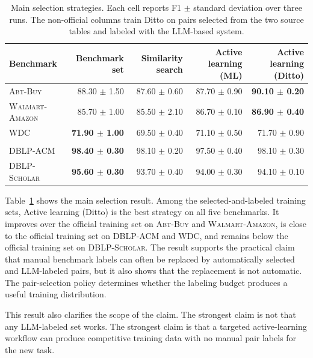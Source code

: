 \begin{table}[t]
  \centering
  \caption{Main selection strategies. Each cell reports F1 $\pm$ standard deviation over three runs. The non-official columns train Ditto on pairs selected from the two source tables and labeled with the LLM-based system.}
  \label{tab:selection-strategies}
  \small
  \begin{tabular}{lrrrr}
    \toprule
    Benchmark & Benchmark set & Similarity search & Active learning (ML) & Active learning (Ditto) \\
    \midrule
    \textsc{Abt-Buy} & 88.30 $\pm$ 1.50 & 87.60 $\pm$ 0.60 & 87.70 $\pm$ 0.90 & \textbf{90.10 $\pm$ 0.20} \\
    \textsc{Walmart-Amazon} & 85.70 $\pm$ 1.00 & 85.50 $\pm$ 2.10 & 86.70 $\pm$ 0.10 & \textbf{86.90 $\pm$ 0.40} \\
    \textsc{WDC} & \textbf{71.90 $\pm$ 1.00} & 69.50 $\pm$ 0.40 & 71.10 $\pm$ 0.50 & 71.70 $\pm$ 0.90 \\
    \\
    \textsc{DBLP-ACM} & \textbf{98.40 $\pm$ 0.30} & 98.10 $\pm$ 0.20 & 97.50 $\pm$ 0.40 & 98.10 $\pm$ 0.30 \\
    \textsc{DBLP-Scholar} & \textbf{95.60 $\pm$ 0.30} & 93.70 $\pm$ 0.40 & 94.00 $\pm$ 0.30 & 94.10 $\pm$ 0.10 \\
    \bottomrule
  \end{tabular}
\end{table}

Table~\ref{tab:selection-strategies} shows the main selection result. Among the selected-and-labeled training sets, Active learning (Ditto) is the best strategy on all five benchmarks. It improves over the official training set on \textsc{Abt-Buy} and \textsc{Walmart-Amazon}, is close to the official training set on \textsc{DBLP-ACM} and \textsc{WDC}, and remains below the official training set on \textsc{DBLP-Scholar}. The result supports the practical claim that manual benchmark labels can often be replaced by automatically selected and LLM-labeled pairs, but it also shows that the replacement is not automatic. The pair-selection policy determines whether the labeling budget produces a useful training distribution.

This result also clarifies the scope of the claim. The strongest claim is not that any LLM-labeled set works. The strongest claim is that a targeted active-learning workflow can produce competitive training data with no manual pair labels for the new task.

